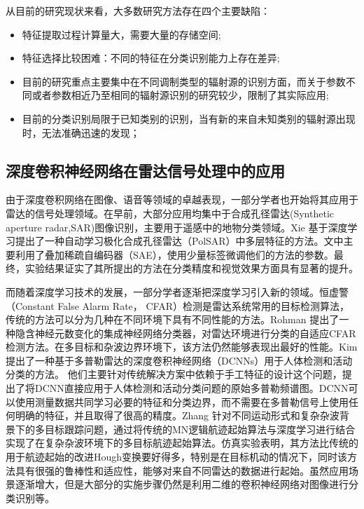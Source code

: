 从目前的研究现状来看，大多数研究方法存在四个主要缺陷：
\begin{itemize}
	\item 特征提取过程计算量大，需要大量的存储空间;
	\item 特征选择比较困难：不同的特征在分类识别能力上存在差异;
	\item 目前的研究重点主要集中在不同调制类型的辐射源的识别方面，而关于参数不同或者参数相近乃至相同的辐射源识别的研究较少，限制了其实际应用;
	\item 目前的分类识别局限于已知类别的识别，当有新的来自未知类别的辐射源出现时，无法准确迅速的发现；
\end{itemize}

\subsection{深度卷积神经网络在雷达信号处理中的应用}

由于深度卷积网络在图像、语音等领域的卓越表现，一部分学者也开始将其应用于雷达的信号处理领域。在早前，大部分应用均集中于合成孔径雷达(Synthetic aperture radar,SAR)图像识别，主要用于遥感中的地物分类领域\cite{chen2014sar,xie2014multilayer,lv2014classification}。Xie \cite{xie2014multilayer}基于深度学习提出了一种自动学习极化合成孔径雷达（PolSAR）中多层特征的方法。文中主要利用了叠加稀疏自编码器（SAE），使用少量标签微调他们的方法的参数。最终，实验结果证实了其所提出的方法在分类精度和视觉效果方面具有显著的提升。

而随着深度学习技术的发展，一部分学者逐渐把深度学习引入新的领域。恒虚警 （Constant False Alarm Rate， CFAR）检测是雷达系统常用的目标检测算法，传统的方法可以分为几种在不同环境下具有不同性能的方法。Rohman \cite{rohman2017classification}提出了一种隐含神经元数变化的集成神经网络分类器，对雷达环境进行分类的自适应CFAR检测方法。在多目标和杂波边界环境下，该方法仍然能够表现出最好的性能。Kim\cite{kim2016human}提出了一种基于多普勒雷达的深度卷积神经网络（DCNNs）用于人体检测和活动分类的方法。 他们主要针对传统解决方案中依赖于手工特征的设计这个问题，提出了将DCNN直接应用于人体检测和活动分类问题的原始多普勒频谱图。DCNN可以使用测量数据共同学习必要的特征和分类边界，而不需要在多普勒信号上使用任何明确的特征，并且取得了很高的精度。Zhang \cite{zhang2017novel}针对不同运动形式和复杂杂波背景下的多目标跟踪问题，通过将传统的MN逻辑航迹起始算法与深度学习进行结合实现了在复杂杂波环境下的多目标航迹起始算法。仿真实验表明，其方法比传统的用于航迹起始的改进Hough变换要好得多，特别是在目标机动的情况下，同时该方法具有很强的鲁棒性和适应性，能够对来自不同雷达的数据进行起始。虽然应用场景逐渐增大，但是大部分的实施步骤仍然是利用二维的卷积神经网络对图像进行分类识别等。

